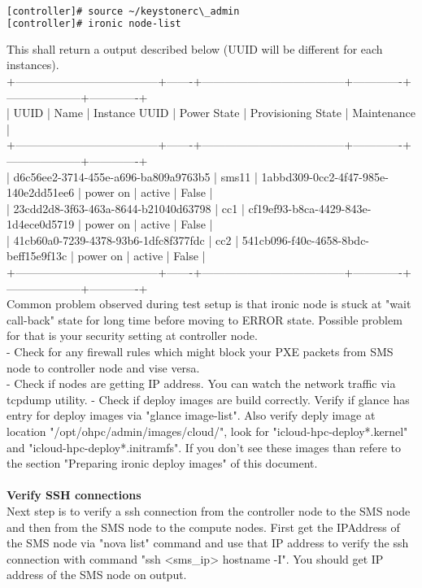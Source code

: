 \begin{lstlisting}[language=bash,keywords={},upquote=true]
[controller]# source ~/keystonerc\_admin
[controller]# ironic node-list
\end{lstlisting}
This shall return a output described below (UUID will be different for each instances).\\
+--------------------------------------+-------+--------------------------------------+-------------+--------------------+-------------+\\
| UUID                                 | Name  | Instance UUID                        | Power State | Provisioning State | Maintenance |\\
+--------------------------------------+-------+--------------------------------------+-------------+--------------------+-------------+\\
| d6c56ee2-3714-455e-a696-ba809a9763b5 | sms11 | 1abbd309-0cc2-4f47-985e-140e2dd51ee6 | power on    | active             | False       |\\
| 23cdd2d8-3f63-463a-8644-b21040d63798 | cc1   | cf19ef93-b8ca-4429-843e-1d4ece0d5719 | power on    | active             | False       |\\
| 41cb60a0-7239-4378-93b6-1dfc8f377fdc | cc2   | 541cb096-f40c-4658-8bdc-beff15e9f13c | power on    | active             | False       |\\
+--------------------------------------+-------+--------------------------------------+-------------+--------------------+-------------+\\

Common problem observed during test setup is that ironic node is stuck at "wait call-back" state for long time before moving to ERROR state. Possible problem for that is your security setting at controller node. \\
- Check for any firewall rules which might block your PXE packets from SMS node to controller node and vise versa. \\
- Check if nodes are getting IP address. You can watch the network traffic via tcpdump utility.
- Check if deploy images are build correctly. Verify if glance has entry for deploy images via "glance image-list". Also verify deply image at location "/opt/ohpc/admin/images/cloud/", look for "icloud-hpc-deploy*.kernel" and "icloud-hpc-deploy*.initramfs". If you don't see these images than refere to the section "Preparing ironic deploy images" of this document. \\
\\
\textbf{Verify SSH connections}\\
Next step is to verify a ssh connection from the controller node to the SMS node and then from the SMS node to the compute nodes. First get the IPAddress of the SMS node via "nova list" command and use that IP address to verify the ssh connection with command "ssh <sms\_ip> hostname -I". You should get IP address of the SMS node on output. 
 
